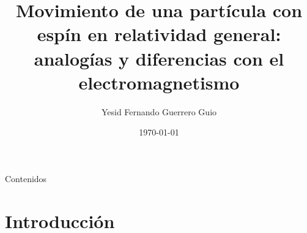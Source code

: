 \documentclass[aspectratio=169,10pt,usenames,dvipsnames,spanish]{beamer}
\title[Plantilla Beamer]{Movimiento de una partícula con espín en relatividad general: analogías y diferencias con el electromagnetismo}
\author[Autor]{Yesid Fernando Guerrero Guio}
\institute{Departamento de física}
\date{\today}
\begin{document}
\justifying %
\begin{frame}
    \titlepage 
\end{frame}
\begin{frame}{Contenidos}
    \tableofcontents
\end{frame}


\section{Introducción}
\end{document}
